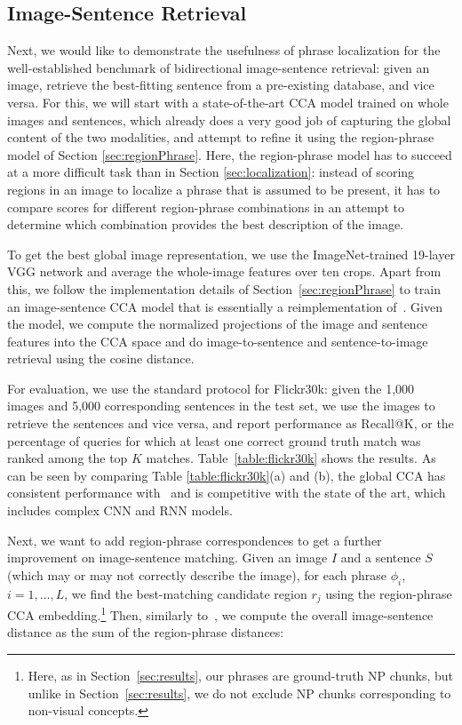 \documentclass[twocolumn]{svjour3}
\begin{document}
\subsection{Image-Sentence Retrieval}
\label{sec:retrieval}
Next, we would like to demonstrate the usefulness of phrase localization for the well-established benchmark of bidirectional image-sentence retrieval: given an image, retrieve the best-fitting sentence from a pre-existing database, and vice versa. For this, we will start with a state-of-the-art CCA model trained on whole images and sentences, which already does a very good job of capturing the global content of the two modalities, and attempt to refine it using the region-phrase model of Section \ref{sec:regionPhrase}. Here, the region-phrase model has to succeed at a more difficult task than in Section \ref{sec:localization}: instead of scoring regions in an image to localize a phrase that is assumed to be present, it has to compare scores for different region-phrase combinations in an attempt to determine which combination provides the best description of the image.

To get the best global image representation, we use the ImageNet-trained 19-layer VGG network and average the whole-image features over ten crops. Apart from this, we follow the implementation details of Section~\ref{sec:regionPhrase} to train an image-sentence CCA model that is essentially a reimplementation of~\cite{klein2014fisher}. Given the model, we compute the normalized projections of the image and sentence features into the CCA space and do image-to-sentence and sentence-to-image retrieval using the cosine distance.

For evaluation, we use the standard protocol for Flickr30k: given the 1,000 images and 5,000 corresponding sentences in the test set, we use the images to retrieve the sentences and vice versa, and report performance as Recall@K, or the percentage of queries for which at least one correct ground truth match was ranked among the top $K$ matches. Table~\ref{table:flickr30k} shows the results. As can be seen by comparing Table \ref{table:flickr30k}(a) and (b), the global CCA has consistent performance with~\cite{klein2014fisher} and is competitive with the state of the art, which includes complex CNN and RNN models.

Next, we want to add region-phrase correspondences to get a further improvement on image-sentence matching. Given an image $I$ and a sentence $S$ (which may or may not correctly describe the image), for each phrase $\phi_{i}$, $i=1,\ldots,L$, we find the best-matching candidate region $r_j$ using the region-phrase CCA embedding.\footnote{Here, as in Section~\ref{sec:results}, our phrases are ground-truth NP chunks, but unlike in Section~\ref{sec:results}, we do not exclude NP chunks corresponding to non-visual concepts.} Then, similarly to~\cite{karpathy2014deep}, we compute the overall image-sentence distance as the sum of the region-phrase distances:
\end{document}
